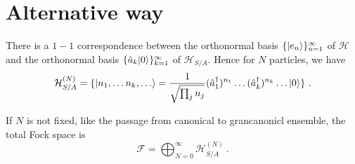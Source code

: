 \section{Alternative way}

    There is a $1-1$ correspondence between the orthonormal basis  $\{\vert e_n\rangle\}_{n=1}^\infty$ of $\mathcal H$ and the orthonormal basis $\{\hat a_k \vert0\rangle\}_{k=1}^\infty$ of $\mathcal H_{S/A}$. Hence for $N$ particles, we have 
    \begin{equation*}
        \mathcal H_{S/A}^{(N)} = \{\vert n_1, \ldots n_k, \ldots\rangle = \frac{1}{\sqrt{ \prod_j n_j}} (\hat a_1^\dagger)^{n_1} \ldots (\hat a_k^\dagger)^{n_k} \ldots \vert0\rangle \} ~.
    \end{equation*} 

    If $N$ is not fixed, like the passage from canonical to grancanonicl ensemble, the total Fock space is 
    \begin{equation*}
        \mathcal F = \bigoplus_{N=0}^\infty \mathcal H^{(N)}_{S/A} ~.
    \end{equation*} 

